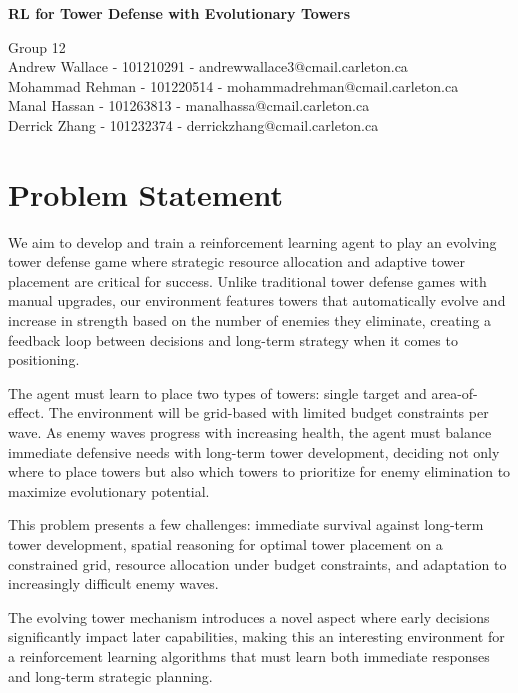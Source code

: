 \documentclass[12pt]{article}
\begin{document}
 

\begin{center} \Large\bf
RL for Tower Defense with Evolutionary Towers\\
\end{center} 

\begin{center}
Group 12 \\
Andrew Wallace - 101210291 - andrewwallace3@cmail.carleton.ca\\
Mohammad Rehman - 101220514 - mohammadrehman@cmail.carleton.ca \\
Manal Hassan - 101263813 - manalhassa@cmail.carleton.ca\\
Derrick Zhang - 101232374 - derrickzhang@cmail.carleton.ca
\end{center}

\section*{Problem Statement}
We aim to develop and train a reinforcement learning agent to play an evolving tower defense game where strategic resource allocation and adaptive tower placement are critical for success. Unlike traditional tower defense games with manual upgrades, our environment features towers that automatically evolve and increase in strength based on the number of enemies they eliminate, creating a feedback loop between decisions and long-term strategy when it comes to positioning.\par
The agent must learn to place two types of towers: single target and area-of-effect. The environment will be grid-based with limited budget constraints per wave. As enemy waves progress with increasing health, the agent must balance immediate defensive needs with long-term tower development, deciding not only where to place towers but also which towers to prioritize for enemy elimination to maximize evolutionary potential.\par

This problem presents a few challenges: immediate survival against long-term tower development, spatial reasoning for optimal tower placement on a constrained grid, resource allocation under budget constraints, and adaptation to increasingly difficult enemy waves. \par

The evolving tower mechanism introduces a novel aspect where early decisions significantly impact later capabilities, making this an interesting environment for a reinforcement learning algorithms that must learn both immediate responses and long-term strategic planning. \par
\end{document}

